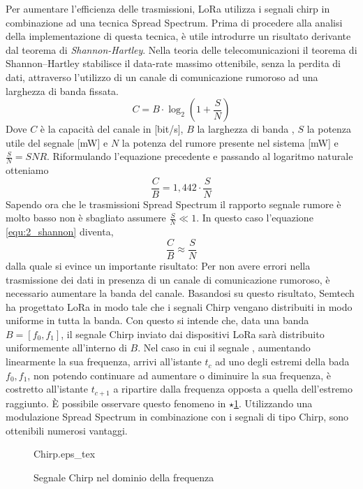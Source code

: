 Per aumentare l'efficienza delle trasmissioni, LoRa utilizza i segnali chirp in
combinazione ad una tecnica  Spread Spectrum. 
Prima di procedere alla analisi della implementazione di questa tecnica,
 è utile introdurre un risultato derivante dal teorema di \textit{Shannon-Hartley}.
Nella teoria delle telecomunicazioni il teorema di Shannon–Hartley stabilisce il
data-rate massimo ottenibile, senza la perdita di dati, attraverso l'utilizzo di un canale di comunicazione 
rumoroso ad una larghezza di banda fissata.
\begin{equation}
        C = B\cdot \log_2\left(1+\frac{S}{N}\right)
\end{equation}
Dove $C$ è la capacità del canale in [bit/s], $B$ la larghezza di banda , $S$ la
potenza utile del segnale  [mW] e $N$ la potenza del rumore presente nel
sistema [mW] e $\frac{S}{N}=SNR$.
Riformulando l'equazione precedente e passando al logaritmo naturale otteniamo
\begin{equation}\label{equ:2_shannon}
        \frac{C}{B} = 1,442 \cdot \frac{S}{N}
\end{equation}
Sapendo ora che le trasmissioni Spread Spectrum il rapporto segnale rumore è
molto basso non è sbagliato assumere $\frac{S}{N} \ll 1$. 
In questo caso l'equazione \ref{equ:2_shannon} diventa,
\begin{equation}
        \frac{C}{B} \approx \frac{S}{N}
\end{equation}
dalla quale si evince un importante risultato: Per non avere errori nella
trasmissione dei dati in presenza di un canale di comunicazione rumoroso, è
necessario aumentare la banda del canale. Basandosi su questo
risultato, Semtech ha progettato LoRa in modo tale che i segnali Chirp vengano
distribuiti in modo uniforme in tutta la banda. 
Con questo si intende che, data una banda $B =
[f_0,f_1]$, il segnale Chirp inviato dai dispositivi LoRa sarà distribuito
uniformemente all'interno di $B$. 
Nel caso in cui il segnale ,  aumentando linearmente la sua frequenza,
arrivi all'istante $t_c$ ad uno degli estremi della bada $f_0,f_1$, non potendo
continuare ad aumentare o diminuire la sua frequenza,
 è costretto all'istante $t_{c+1}$ a ripartire dalla frequenza opposta a quella
dell'estremo raggiunto. È possibile osservare questo fenomeno in
\hyperlink{label_in_fig_1}{$\star$}\ref{fig:chirp_freq}.
Utilizzando una modulazione Spread Spectrum in combinazione con i segnali di tipo
Chirp, sono ottenibili numerosi vantaggi.
\begin{figure}[ht]
        \centering
                {Chirp.eps_tex}
        \caption{Segnale Chirp nel dominio della frequenza}
        \label{fig:chirp_freq}
\end{figure}
